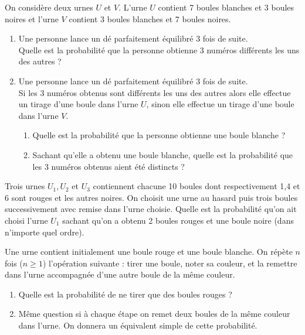 \documentclass[a4paper,10pt]{report}
\begin{document}
\begin{Exa} On considère deux urnes $U$ et $V$. L'urne $U$ contient 7 boules blanches et 3 boules noires et l'urne $V$ contient 3 boules blanches et 7 boules noires.

\begin{enumerate}
\item Une personne lance un dé parfaitement équilibré 3 fois de suite.\\
 Quelle est la probabilité que la personne obtienne 3 numéros différents les uns des autres ?
\item Une personne lance un dé parfaitement équilibré 3 fois de suite.\\
Si les 3 numéros obtenus sont différents les uns des autres alors elle effectue un tirage d'une boule dans l'urne $U$, sinon elle effectue un tirage d'une boule dans l'urne $V$.
\begin{enumerate}
\item Quelle est la probabilité que la personne obtienne une boule blanche ?
\item Sachant qu'elle a obtenu une boule blanche, quelle est la probabilité que les 3 numéros obtenus aient été distincts ?
\end{enumerate}
\end{enumerate}
\end{Exa} 


\begin{Exa} Trois urnes $U_1, U_2 $ et $U_3$ contiennent chacune 10 boules dont respectivement 1,4 et 6 sont rouges et les autres noires. On choisit une urne au hasard puis trois boules successivement avec remise dans l'urne choisie. Quelle est la probabilité qu'on ait choisi l'urne $U_1$ sachant qu'on a obtenu 2 boules rouges et une boule noire (dans n'importe quel ordre).
\end{Exa}

\begin{Exa} Une urne contient initialement une boule rouge et une boule blanche. On répète $n$ fois ($n \geq 1$) l'opération suivante : tirer une boule, noter sa couleur, et la remettre dans l'urne accompagnée d'une autre boule de la même couleur. 

\begin{enumerate}
\item Quelle est la probabilité de ne tirer que des boules rouges ?
\item Même question si à chaque étape on remet deux boules de la même couleur dans l'urne. On donnera un équivalent simple de cette probabilité.
\end{enumerate}
\end{Exa} 
\end{document}
